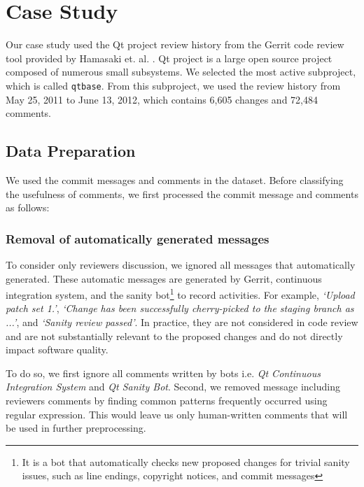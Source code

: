 
\section{Case Study}

Our case study used the Qt project review history from the Gerrit code review tool provided by Hamasaki et. al. \cite{Hamasaki2013}. Qt project is a large open source project composed of numerous small subsystems. We selected the most active subproject, which is called \texttt{qtbase}.
From this subproject, we used the review history from May 25, 2011 to June 13, 2012, which contains 6,605 changes and 72,484 comments.


\subsection{Data Preparation}
We used the commit messages and comments in the dataset.
Before classifying the usefulness of comments, we first processed the commit message and comments as follows: 

\subsubsection{Removal of automatically generated messages} To consider only reviewers discussion, we ignored all messages that automatically generated.
These automatic messages are generated by Gerrit, continuous integration system, and the sanity bot\footnote{It is a bot that automatically checks new proposed changes for trivial sanity issues, such as line endings, copyright notices, and commit messages} to record activities. For example, \textit{`Upload patch set 1.'}, \textit{`Change has been successfully cherry-picked to the staging branch as ...'}, and \textit{`Sanity review passed'}. In practice, they are not considered in code review  and are not substantially relevant to the proposed changes and do not directly impact software quality\cite{Mcintosh}. 

To do so, we first ignore all comments written by bots i.e. \emph{Qt Continuous Integration System} and \emph{Qt Sanity Bot}. Second, we removed message including reviewers comments by finding common patterns frequently occurred using regular expression. This would leave us only human-written comments that will be used in further preprocessing.

